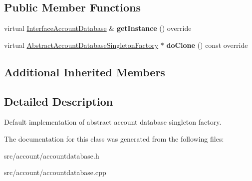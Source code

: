 \subsection*{Public Member Functions}
\begin{DoxyCompactItemize}
\item 
\mbox{\label{classAccountDatabaseSingletonFactoryDefault_a4087f03d6d173982d0a681c828bb0f27}} 
virtual \hyperlink{classInterfaceAccountDatabase}{Interface\+Account\+Database} \& {\bfseries get\+Instance} () override
\item 
\mbox{\label{classAccountDatabaseSingletonFactoryDefault_afc11e06d193ebc6792551a51496c5b35}} 
virtual \hyperlink{classAbstractAccountDatabaseSingletonFactory}{Abstract\+Account\+Database\+Singleton\+Factory} $\ast$ {\bfseries do\+Clone} () const override
\end{DoxyCompactItemize}
\subsection*{Additional Inherited Members}


\subsection{Detailed Description}
Default implementation of abstract account database singleton factory. 

The documentation for this class was generated from the following files\+:\begin{DoxyCompactItemize}
\item 
src/account/accountdatabase.\+h\item 
src/account/accountdatabase.\+cpp\end{DoxyCompactItemize}
